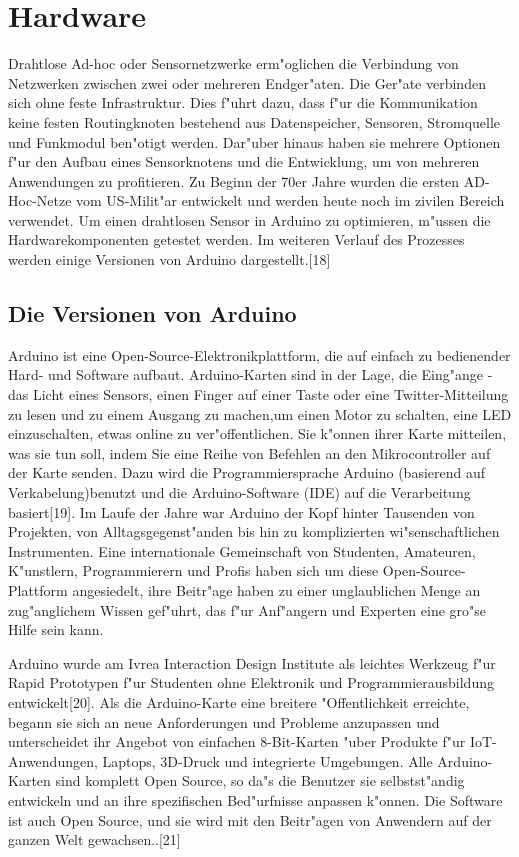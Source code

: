 \section{Hardware}
Drahtlose Ad-hoc oder Sensornetzwerke erm"oglichen 
die Verbindung von Netzwerken zwischen zwei oder mehreren Endger"aten. 
Die Ger"ate verbinden sich ohne feste Infrastruktur. Dies f"uhrt dazu, 
dass f"ur die Kommunikation keine festen Routingknoten 
bestehend aus Datenspeicher, Sensoren, Stromquelle und 
Funkmodul ben"otigt werden. Dar"uber hinaus haben sie mehrere 
Optionen f"ur den Aufbau eines Sensorknotens und die Entwicklung, 
um von mehreren Anwendungen zu profitieren.    
Zu Beginn der 70er Jahre wurden die ersten AD-Hoc-Netze vom US-Milit"ar 
entwickelt und werden heute noch im zivilen Bereich verwendet. 
Um einen drahtlosen Sensor in Arduino zu optimieren, 
m"ussen die Hardwarekomponenten getestet werden. 
Im weiteren Verlauf des Prozesses werden 
einige Versionen von Arduino dargestellt.[18]

\subsection{Die Versionen von Arduino}

Arduino ist eine Open-Source-Elektronikplattform, 
die auf einfach zu bedienender Hard- und Software aufbaut. 
Arduino-Karten sind in der Lage, die Eing"ange -
 das Licht eines Sensors, 
 einen Finger auf einer Taste oder eine Twitter-Mitteilung 
 zu lesen und zu einem Ausgang zu machen,um einen Motor zu schalten, 
 eine LED einzuschalten, 
 etwas online zu ver"offentlichen. 
 Sie k"onnen ihrer Karte mitteilen, was sie tun soll, 
 indem Sie eine Reihe von Befehlen an den Mikrocontroller 
 auf der Karte senden. 
 Dazu wird die Programmiersprache Arduino 
 (basierend auf Verkabelung)benutzt und die Arduino-Software (IDE)  
  auf die Verarbeitung basiert[19].
Im Laufe der Jahre war Arduino der Kopf hinter Tausenden von Projekten, 
von Alltagsgegenst"anden bis hin zu komplizierten wi"senschaftlichen
Instrumenten. Eine internationale Gemeinschaft von Studenten, 
Amateuren, K"unstlern, Programmierern und Profis haben sich um diese 
Open-Source-Plattform angesiedelt, ihre Beitr"age haben 
zu einer unglaublichen Menge an zug"anglichem Wissen gef"uhrt, 
das f"ur Anf"angern und Experten eine gro"se Hilfe sein kann.

Arduino wurde am Ivrea Interaction Design Institute als 
leichtes Werkzeug f"ur Rapid Prototypen f"ur Studenten ohne Elektronik
 und Programmierausbildung entwickelt[20]. 
 Als die Arduino-Karte eine breitere "Offentlichkeit erreichte, 
 begann sie sich an neue Anforderungen und Probleme anzupassen 
 und unterscheidet ihr Angebot von einfachen 8-Bit-Karten 
 "uber Produkte f"ur IoT-Anwendungen, Laptops, 3D-Druck und 
 integrierte Umgebungen. Alle Arduino-Karten sind komplett 
 Open Source, so da"s die Benutzer sie selbstst"andig entwickeln 
 und an ihre spezifischen Bed"urfnisse anpassen k"onnen. 
 Die Software ist auch Open Source, 
 und sie wird mit den Beitr"agen von Anwendern 
 auf der ganzen Welt gewachsen..[21]

